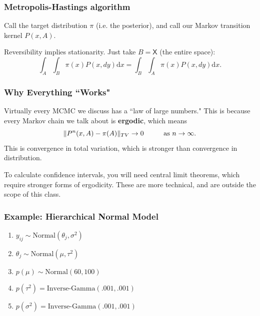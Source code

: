 \documentclass{beamer}
\begin{document}
\begin{frame}
\frametitle{Metropolis-Hastings algorithm}

Call the target distribution $\pi$ (i.e. the posterior), and call our Markov transition kernel $P(x, A)$.
\newline

Reversibility implies stationarity. Just take $B = \mathsf{X}$ (the entire space):
$$
\int_A\int_B \pi(x) P(x, dy) \text{d}x = \int_B\int_A \pi(x) P(x, dy) \text{d}x.
$$

\end{frame}

\begin{frame}
\frametitle{Why Everything ``Works"}

Virtually every MCMC we discuss has a ``law of large numbers." This is because every Markov chain we talk about is {\bf ergodic}, which means 
$$
\Vert P^n(x,A)- \pi(A) \Vert_{TV} \to 0 \hspace{10mm} \text{as } n \to \infty.
$$
This is convergence in total variation, which is stronger than convergence in distribution.
\newline

To calculate confidence intervals, you will need central limit theorems, which require stronger forms of ergodicity. These are more technical, and are outside the scope of this class.




\end{frame}


\begin{frame}
\frametitle{Example: Hierarchical Normal Model}

\begin{enumerate}
\item $y_{ij} \sim \text{Normal}(\theta_j, \sigma^2)$
\item $\theta_j \sim \text{Normal}(\mu, \tau^2)$
\item $p(\mu) \sim \text{Normal}(60, 100)$
\item $p(\tau^2) = \text{Inverse-Gamma}(.001, .001)$
\item $p(\sigma^2) = \text{Inverse-Gamma}(.001, .001)$
\end{enumerate}

\end{frame}
\end{document}
